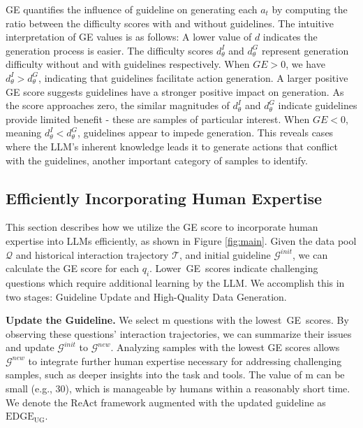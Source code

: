 GE quantifies the influence of guideline on generating each $a_t$ by computing the ratio between the difficulty scores with and without guidelines. 
The intuitive interpretation of GE values is as follows:
A lower value of $d$ indicates the generation process is easier. The difficulty scores $d_\theta^{I}$ and $d_\theta^{G}$ represent generation difficulty without and with guidelines respectively.
When \textbf{$GE > 0$}, we have $d_\theta^{I} > d_\theta^{G}$, indicating that guidelines facilitate action generation. A larger positive GE score suggests guidelines have a stronger positive impact on generation. As the score approaches zero, the similar magnitudes of $d_\theta^{I}$ and $d_\theta^{G}$ indicate guidelines provide limited benefit - these are samples of particular interest.
When \textbf{$GE < 0$}, meaning $d_\theta^{I} < d_\theta^{G}$, guidelines appear to impede generation. This reveals cases where the LLM's inherent knowledge leads it to generate actions that conflict with the guidelines, another important category of samples to identify.



\subsection{Efficiently Incorporating Human Expertise}




This section describes how we utilize the GE score to incorporate human expertise into LLMs efficiently, as shown in Figure \ref{fig:main}. Given the data pool $\mathcal{Q}$ and historical interaction trajectory $\mathcal{T}$, and initial guideline $\mathcal{G}^{init}$, we can calculate the GE score for each $q_i$. Lower GE scores indicate challenging questions which require additional learning by the LLM. We accomplish this in two stages: Guideline Update and High-Quality Data Generation.

\textbf{Update the Guideline.} We select m questions with the lowest GE scores. By observing these questions' interaction trajectories, we can summarize their issues and update $\mathcal{G}^{init}$ to $\mathcal{G}^{new}$. Analyzing samples with the lowest GE scores allows $\mathcal{G}^{new}$ to integrate further human expertise necessary for addressing challenging samples, such as deeper insights into the task and tools. The value of m can be small (e.g., 30), which is manageable by humans within a reasonably short time. We denote the ReAct framework augmented with the updated guideline as $\text{EDGE}_\text{UG}$.

